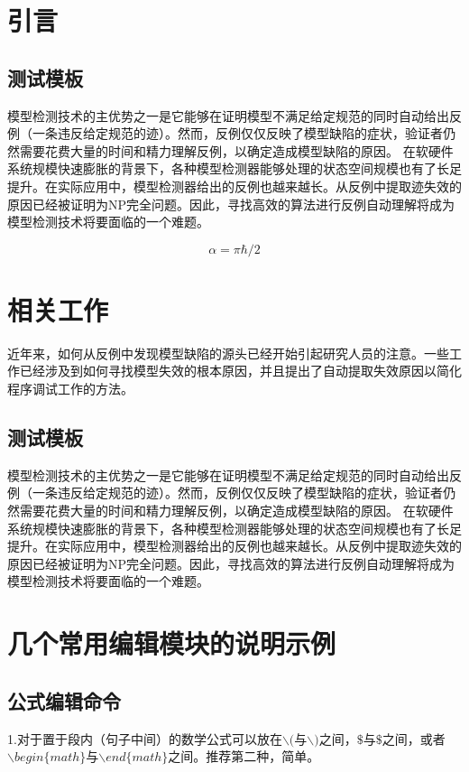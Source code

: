 \documentclass[onecolumn,a4paper,10pt]{article}
\begin{document}
\section{引言}

\subsection{测试模板}

模型检测技术\cite{mc1,mc2,mc3}的主优势之一是它能够在证明模型不满足给定规范的同时自动给出反例（一条违反给定规范的迹）。然而，反例仅仅反映了模型缺陷的症状，验证者仍然需要花费大量的时间和精力理解反例，以确定造成模型缺陷的原因。 在软硬件系统规模快速膨胀的背景下，各种模型检测器能够处理的状态空间规模也有了长足提升。在实际应用中，模型检测器给出的反例也越来越长。从反例中提取迹失效的原因已经被证明为NP完全问题\cite{np1,np2,np3}。因此，寻找高效的算法进行反例自动理解将成为模型检测技术将要面临的一个难题。

\begin{equation}
\alpha=\pi \hbar/2
\end{equation}

\section{相关工作}

近年来，如何从反例中发现模型缺陷的源头已经开始引起研究人员的注意。一些工作已经涉及到如何寻找模型失效的根本原因，并且提出了自动提取失效原因以简化程序调试工作的方法。

\subsection{测试模板}
模型检测技术\cite{mc1,mc2,mc3}的主优势之一是它能够在证明模型不满足给定规范的同时自动给出反例（一条违反给定规范的迹）。然而，反例仅仅反映了模型缺陷的症状，验证者仍然需要花费大量的时间和精力理解反例，以确定造成模型缺陷的原因。 在软硬件系统规模快速膨胀的背景下，各种模型检测器能够处理的状态空间规模也有了长足提升。在实际应用中，模型检测器给出的反例也越来越长。从反例中提取迹失效的原因已经被证明为NP完全问题\cite{np1,np2,np3}。因此，寻找高效的算法进行反例自动理解将成为模型检测技术将要面临的一个难题。


\section{几个常用编辑模块的说明示例}
\subsection{公式编辑命令}
1.对于置于段内（句子中间）的数学公式可以放在$\backslash ($与$\backslash )$之间，$\$ $与$\$ $之间，或者$\backslash begin\{ math \}$与$\backslash end\{ math \}$之间。推荐第二种，简单。
\end{document}
